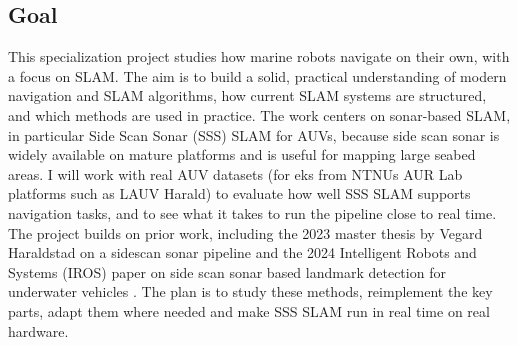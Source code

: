 \subsection{Goal}
This specialization project studies how marine robots navigate on their own, with a focus on SLAM. The aim is to build a solid, practical understanding of modern navigation and SLAM algorithms, how current SLAM systems are structured, and which methods are used in practice. The work centers on sonar-based SLAM, in particular Side Scan Sonar (SSS) SLAM for AUVs, because side scan sonar is widely available on mature platforms and is useful for mapping large seabed areas. I will work with real AUV datasets (for eks from NTNUs AUR Lab platforms such as LAUV Harald) to evaluate how well SSS SLAM supports navigation tasks, and to see what it takes to run the pipeline close to real time. The project builds on prior work, including the 2023 master thesis by Vegard Haraldstad on a sidescan sonar pipeline \cite{side_scan_sonar_master_thesis} and the 2024 Intelligent Robots and Systems (IROS) paper on side scan sonar based landmark detection for underwater vehicles \cite{side_scan_sonar_paper}. The plan is to study these methods, reimplement the key parts, adapt them where needed and make SSS SLAM run in real time on real hardware.